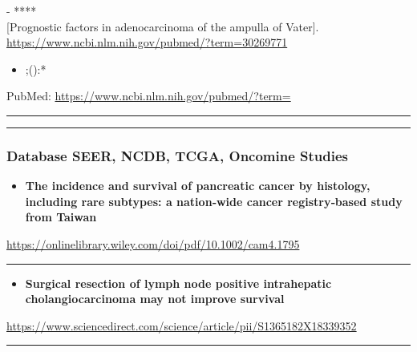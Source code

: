 \documentclass[]{article}
\providecommand{\tightlist}{%
  \setlength{\itemsep}{0pt}\setlength{\parskip}{0pt}}
\begin{document}
 - ****\\
{[}Prognostic factors in adenocarcinoma of the ampulla of Vater{]}.\\

\url{https://www.ncbi.nlm.nih.gov/pubmed/?term=30269771}

\begin{itemize}
\tightlist
\item
  ;():*
\end{itemize}

PubMed: \url{https://www.ncbi.nlm.nih.gov/pubmed/?term=}

{}

{}

\begin{center}\rule{0.5\linewidth}{\linethickness}\end{center}

\begin{center}\rule{0.5\linewidth}{\linethickness}\end{center}

\hypertarget{database-seer-ncdb-tcga-oncomine-studies}{%
\subsubsection{Database SEER, NCDB, TCGA, Oncomine
Studies}\label{database-seer-ncdb-tcga-oncomine-studies}}

\begin{itemize}
\tightlist
\item
  \textbf{The incidence and survival of pancreatic cancer by histology,
  including rare subtypes: a nation‐wide cancer registry‐based study
  from Taiwan}
\end{itemize}

\url{https://onlinelibrary.wiley.com/doi/pdf/10.1002/cam4.1795}

\begin{center}\rule{0.5\linewidth}{\linethickness}\end{center}

\begin{itemize}
\tightlist
\item
  \textbf{Surgical resection of lymph node positive intrahepatic
  cholangiocarcinoma may not improve survival}
\end{itemize}

\url{https://www.sciencedirect.com/science/article/pii/S1365182X18339352}

\begin{center}\rule{0.5\linewidth}{\linethickness}\end{center}
\end{document}
